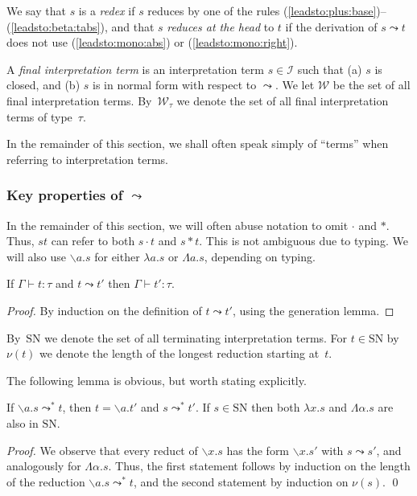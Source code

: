 \documentclass[runningheads,a4paper]{llncs}
\newcommand{\Iterms}{\mathcal{I}}
\newcommand{\World}{\mathcal{W}}
\newcommand{\abs}[2]{\lambda #1.#2}
\newcommand{\tabs}[2]{\Lambda #1.#2}
\newcommand{\abstraction}[2]{\backslash #1.#2}
\newcommand{\app}[2]{#1 \cdot #2}
\newcommand{\tapp}[2]{#1 * #2}
\newcommand{\SN}{\mathrm{SN}}
\begin{document}
\begin{definition}
  We say that $s$ is a \emph{redex} if $s$ reduces by one of the rules
  (\ref{leadsto:plus:base})--(\ref{leadsto:beta:tabs}), and that $s$
  \emph{reduces at the head} to $t$ if the derivation of
  $s \leadsto t$ does not use (\ref{leadsto:mono:abs}) or
  (\ref{leadsto:mono:right}).

  A \emph{final interpretation term} is an interpretation term
  $s \in \Iterms$ such that (a) $s$ is closed, and (b) $s$ is in
  normal form with respect to $\leadsto$.  We let $\World$ be the set
  of all final interpretation terms. By~$\World_\tau$ we denote the
  set of all final interpretation terms of type~$\tau$.
\end{definition}

In the remainder of this section, we shall often speak simply of
``terms'' when referring to interpretation terms.

\subsubsection{Key properties of $\leadsto$}
In the remainder of this section, we will often abuse notation to omit
$\cdot$ and $*$.  Thus, $s t$ can refer to both $\app{s}{t}$ and
$\tapp{s}{t}$. This is not ambiguous due to typing. We will also use
$\abstraction{a}{s}$ for either $\abs{a}{s}$ or $\tabs{a}{s}$,
depending on typing.

\begin{lemma}
  If $\Gamma \vdash t : \tau$ and $t \leadsto t'$ then
  $\Gamma \vdash t' : \tau$.
\end{lemma}

\begin{proof}
  By induction on the definition of $t \leadsto t'$, using the
  generation lemma.
\end{proof}

By~$\SN$ we denote the set of all terminating interpretation
terms. For $t \in \SN$ by~$\nu(t)$ we denote the length of the longest
reduction starting at~$t$.

The following lemma is obvious, but worth stating explicitly.

\begin{lemma}\label{lem_reduce_abs}
  If $\abstraction{a}{s} \leadsto^* t$, then $t = \abstraction{a}{t'}$
  and $s \leadsto^* t'$.  If $s \in \SN$ then both $\abs{x}{s}$ and
  $\tabs{\alpha}{s}$ are also in $\SN$.
\end{lemma}

\begin{proof}
  We observe that every reduct of $\abstraction{x}{s}$ has the form
  $\abstraction{x}{s'}$ with $s \leadsto s'$, and analogously for
  $\tabs{\alpha}{s}$.  Thus, the first statement follows by induction
  on the length of the reduction $\abstraction{a}{s} \leadsto^* t$,
  and the second statement by induction on $\nu(s)$.  \qed
\end{proof}
\end{document}
